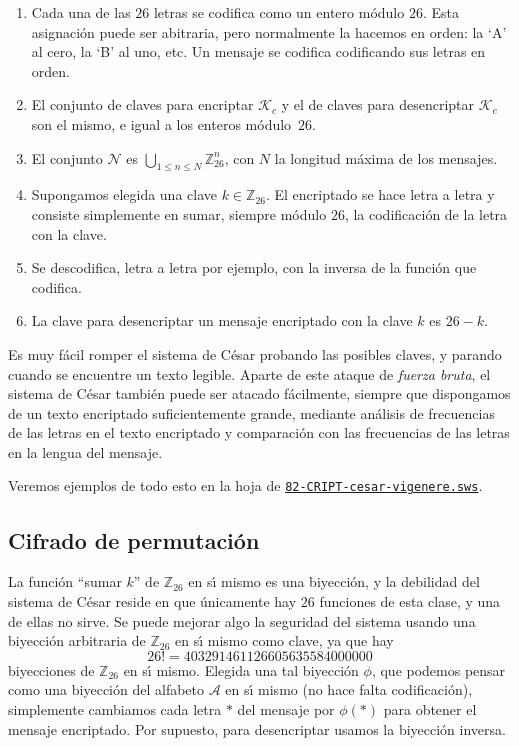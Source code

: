 \begin{enumerate}
 \item Cada una de las $26$ letras se codifica como un entero m\'odulo $26$.
Esta asignaci\'on puede ser abitraria, pero normalmente la hacemos en orden: la
`A' al cero, la `B' al uno, etc. Un mensaje se codifica codificando sus letras
en orden. 
 \item El conjunto de claves para encriptar $\mathscr{K}_c$ y el de claves para
desencriptar $\mathscr{K}_c$ son el mismo, e igual a los enteros m\'odulo~$26$.
 \item El conjunto $\mathscr{N}$ es $\bigcup_{1\le n\le N}\mathbb{Z}_{26}^n$,
con
$N$ la longitud m\'axima de los mensajes.
 \item Supongamos elegida una clave $k\in \mathbb{Z}_{26}$. El encriptado se
hace letra a letra y consiste simplemente en sumar, siempre m\'odulo $26$, la
codificaci\'on de la letra con la clave. 
 \item Se descodifica, letra a letra por ejemplo, con la inversa de la funci\'on
que codifica.
 \item La clave para desencriptar un mensaje encriptado con la clave $k$ es
$26-k$.
 \end{enumerate}

Es muy f\'acil romper el sistema de C\'esar probando las posibles claves, y
parando cuando se encuentre un texto legible. Aparte de este ataque de {\itshape
fuerza bruta}, el sistema de C\'esar tambi\'en puede ser atacado f\'acilmente,
siempre que dispongamos de un texto encriptado suficientemente grande,  mediante
an\'alisis de frecuencias de las letras en el texto encriptado y comparaci\'on
con las frecuencias de las letras en la lengua del mensaje. 

Veremos ejemplos de todo esto en la hoja de {\sage} 
\href{http://sage.mat.uam.es:8888/home/pub/22/}{\tt 82-CRIPT-cesar-vigenere.sws}.
 
 
 
 
 
 \subsection{Cifrado de permutaci\'on}

 La funci\'on ``sumar $k$'' de $\mathbb{Z}_{26}$ en s\'{\i} mismo es una
biyecci\'on, y la debilidad del sistema de C\'esar reside en que \'unicamente
hay $26$ funciones de esta clase, y una de ellas no sirve.  Se puede mejorar
algo la seguridad del sistema usando una biyecci\'on arbitraria de
$\mathbb{Z}_{26}$ en s\'{\i} mismo como clave, ya que hay 
\[26!=403291461126605635584000000\]
\noindent  biyecciones de $\mathbb{Z}_{26}$ en s\'{\i} mismo. Elegida una tal
biyecci\'on $\phi$, que podemos
pensar como una biyecci\'on del alfabeto $\mathscr{A}$ en s\'{\i} mismo (no hace
falta codificaci\'on),
simplemente cambiamos cada letra $*$ del mensaje  por $\phi(*)$ para obtener el
mensaje encriptado. Por supuesto, para desencriptar usamos la biyecci\'on
inversa. 



